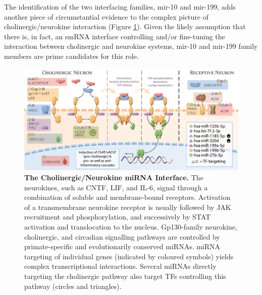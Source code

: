 The identification of the two interfacing families, mir-10 and mir-199, adds another piece of circumstantial evidence to the complex picture of cholinergic/neurokine interaction (Figure \ref{fig:neurokine}). Given the likely assumption that there is, in fact, an smRNA interface controlling and/or fine-tuning the interaction between cholinergic and neurokine systems, mir-10 and mir-199 family members are prime candidates for this role.

\begin{figure}
\includegraphics[width=\textwidth]{figures/neurokine}
\caption[The Cholinergic/Neurokine miRNA Interface.]{\textbf{The Cholinergic/Neurokine miRNA Interface.} The neurokines, such as CNTF, LIF, and IL-6, signal through a combination of soluble and membrane-bound receptors. Activation of a transmembrane neurokine receptor is usually followed by JAK recruitment and phosphorylation, and successively by STAT activation and translocation to the nucleus. Gp130-family neurokine, cholinergic, and circadian signalling pathways are controlled by primate-specific and evolutionarily conserved miRNAs. miRNA targeting of individual genes (indicated by coloured symbols) yields complex transcriptional interactions. Several miRNAs directly targeting the cholinergic pathway also target TFs controlling this pathway (circles and triangles).
\label{fig:neurokine}}
\end{figure}

